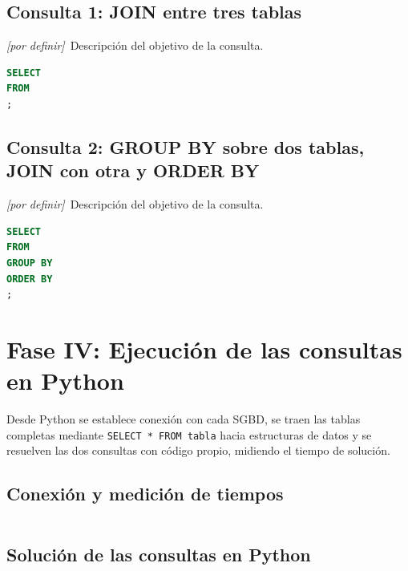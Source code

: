 \documentclass[11pt,a4paper]{article}
\newcommand{\pordefinir}{\textit{\color{gris}[por definir]}}
\begin{document}
\subsection{Consulta 1: JOIN entre tres tablas}

\pordefinir\ Descripción del objetivo de la consulta.

\begin{lstlisting}[language=SQL,caption={Consulta 1.},label={lst:consulta1}]
SELECT
FROM
;
\end{lstlisting}

\subsection{Consulta 2: GROUP BY sobre dos tablas, JOIN con otra y ORDER BY}

\pordefinir\ Descripción del objetivo de la consulta.

\begin{lstlisting}[language=SQL,caption={Consulta 2.},label={lst:consulta2}]
SELECT
FROM
GROUP BY
ORDER BY
;
\end{lstlisting}

\section{Fase IV: Ejecución de las consultas en Python}
\label{sec:fase4}

Desde Python se establece conexión con cada SGBD, se traen las tablas completas
mediante \texttt{SELECT * FROM tabla} hacia estructuras de datos y se resuelven las
dos consultas con código propio, midiendo el tiempo de solución.

\subsection{Conexión y medición de tiempos}

\begin{lstlisting}[language=Python,caption={Conectividad y medición de tiempos.},label={lst:conexion}]

\end{lstlisting}

\subsection{Solución de las consultas en Python}

\begin{lstlisting}[language=Python,caption={Resolución de las consultas en Python.},label={lst:pyconsultas}]

\end{lstlisting}
\end{document}
